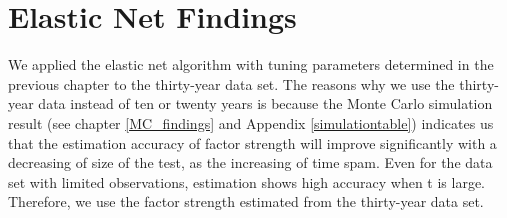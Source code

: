 \section{Elastic Net Findings}
We applied the elastic net algorithm with tuning parameters determined in the previous chapter to the thirty-year data set.
The reasons why we use the thirty-year data instead of ten or twenty years is because the Monte Carlo simulation result (see chapter \ref{MC_findings} and Appendix \ref{simulationtable}) indicates us that the estimation accuracy of factor strength will improve significantly with a decreasing of size of the test, as the increasing of time spam.
Even for the data set with limited observations, estimation shows high accuracy when t is large.
Therefore, we use the factor strength estimated from the thirty-year data set.

